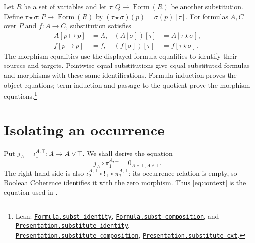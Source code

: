 \documentclass[11pt]{article}
\newcommand{\FormulaSet}{\operatorname{Form}}
\begin{document}
Let $R$ be a set of variables and let
$\tau:Q\to\FormulaSet(R)$ be another substitution. Define
$\tau\star\sigma:P\to\FormulaSet(R)$ by
$(\tau\star\sigma)(p)=\sigma(p)[\tau]$. For formulas $A,C$ over
$P$ and $f:A\to C$, substitution satisfies
\[
 \begin{aligned}
 A[p\mapsto p]&=A,&
 (A[\sigma])[\tau]&=A[\tau\star\sigma],\\
 f[p\mapsto p]&=f,&
 (f[\sigma])[\tau]&=f[\tau\star\sigma].
 \end{aligned}
\]
The morphism equalities use the displayed formula equalities to
identify their sources and targets. Pointwise equal substitutions
give equal substituted formulas and morphisms with these same
identifications. Formula induction proves the object equations;
term induction and passage to the quotient prove the morphism
equations.\footnote{\raggedright Lean:
\href{https://github.com/flengyel/Dosen-Petric-Maximality/blob/5dbee39bea09539bd130f729e82636419f71f920/DosenPetric/FormulaSubstitutionLaws.lean\#L11}{\texttt{Formula.\allowbreak{}subst\_identity}},
\href{https://github.com/flengyel/Dosen-Petric-Maximality/blob/5dbee39bea09539bd130f729e82636419f71f920/DosenPetric/FormulaSubstitutionLaws.lean\#L20}{\texttt{Formula.\allowbreak{}subst\_composition}}, and
\href{https://github.com/flengyel/Dosen-Petric-Maximality/blob/5dbee39bea09539bd130f729e82636419f71f920/DosenPetric/PresentationSubstitutionActionQuotient.lean\#L39}{\texttt{Presentation.\allowbreak{}substitute\_identity}},
\href{https://github.com/flengyel/Dosen-Petric-Maximality/blob/5dbee39bea09539bd130f729e82636419f71f920/DosenPetric/PresentationSubstitutionActionQuotient.lean\#L44}{\texttt{Presentation.\allowbreak{}substitute\_composition}},
\href{https://github.com/flengyel/Dosen-Petric-Maximality/blob/5dbee39bea09539bd130f729e82636419f71f920/DosenPetric/PresentationSubstitutionActionQuotient.lean\#L57}{\texttt{Presentation.\allowbreak{}substitute\_ext}}.}

\section{Isolating an occurrence}\label{sec:isolation}

Put $j_A=\iota_1^{A,\top}:A\to A\vee\top$. We shall derive the equation
\begin{equation}
 j_A\circ\pi_1^{A,\bot}
   =0_{A\wedge\bot,A\vee\top}.
 \tag{$K_A$}\label{eq:context}
\end{equation}
The right-hand side is also
$\iota_2^{A,\top}\circ!_\bot\circ\pi_2^{A,\bot}$: its occurrence
relation is empty, so Boolean Coherence identifies it with the zero
morphism. Thus \eqref{eq:context} is the equation used in
\cite[\S9.7, pp.~215--216]{DP}.
\end{document}
